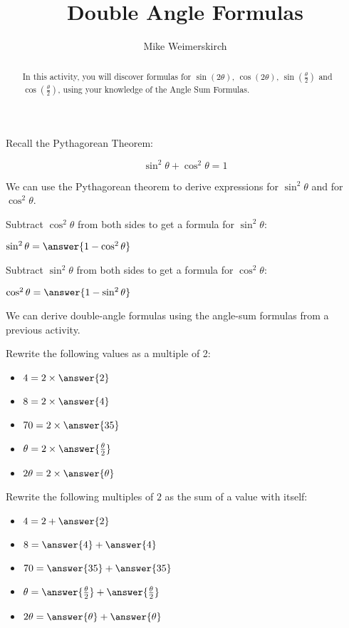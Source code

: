 \documentclass[numbers]{ximera}
\title{Double Angle Formulas}
\author{Mike Weimerskirch}
\begin{document}
\begin{abstract}
  In this activity, you will discover formulas for $\sin (2\theta)$, $\cos (2\theta)$, $\sin \left(\frac{\theta}{2}\right)$ and $\cos \left(\frac{\theta}{2}\right)$, using your knowledge of the Angle Sum Formulas.
\end{abstract}

\maketitle


Recall the Pythagorean Theorem:

\[\sin^2 \theta + \cos^2 \theta = 1\]

We can use the Pythagorean theorem to derive expressions for $\sin^2\theta$ and for $\cos^2\theta$.

\begin{problem}
Subtract $\cos^2 \theta$ from both sides to get a formula for $\sin^2 \theta$:

$\sin^2 \theta =\answer{1-\cos^2 \theta} $
\end{problem}

\begin{problem}
Subtract $\sin^2 \theta$ from both sides to get a formula for $\cos^2 \theta$:

$\cos^2\theta = \answer{1-\sin^2\theta}$
\end{problem}

We can derive double-angle formulas using the angle-sum formulas from a previous activity.

\begin{problem}
Rewrite the following values as a multiple of 2:
\begin{itemize}
	\item $4=2\times\answer{2}$
	\item $8=2\times\answer{4}$
	\item $70=2\times\answer{35}$
	\item $\theta = 2 \times \answer{\frac{\theta}{2}}$
	\item $2\theta = 2\times\answer{\theta}$
\end{itemize}
\end{problem}

\begin{problem}
Rewrite the following multiples of $2$ as the sum of a value with itself:
\begin{itemize}
	\item $4=2+\answer{2}$
	\item $8=\answer{4}+\answer{4}$
	\item $70=\answer{35}+\answer{35}$
	\item $\theta = \answer{\frac{\theta}{2}}+\answer{\frac{\theta}{2}}$
	\item $2\theta=\answer{\theta}+\answer{\theta}$
\end{itemize}
\end{problem}
\end{document}
